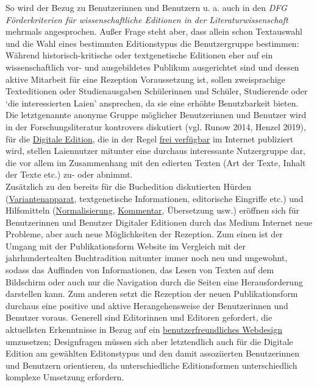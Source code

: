 \documentclass{article}
\begin{document}
        So wird der Bezug zu Benutzerinnen und Benutzern u. a. auch in den \emph{DFG Förderkriterien für wissenschaftliche Editionen in der Literaturwissenschaft} mehrmals angesprochen. Außer Frage steht aber, dass allein schon Textauswahl und die Wahl eines bestimmten Editionstypus die Benutzergruppe bestimmen: Während historisch-kritische oder textgenetische Editionen eher auf ein wissenschaftlich vor- und ausgebildetes Publikum ausgerichtet sind und dessen aktive Mitarbeit für eine Rezeption Voraussetzung ist, sollen zweisprachige Texteditionen oder Studienausgaben Schülerinnen und Schüler, Studierende oder ‘die interessierten Laien’ ansprechen, da sie eine erhöhte Benutzbarkeit bieten. \\
            
        Die letztgenannte anonyme Gruppe möglicher Benutzerinnen und Benutzer wird in der Forschungsliteratur kontrovers diskutiert (vgl. Runow 2014, Henzel 2019), für die \href{http://gams.uni-graz.at/o:konde.59}{Digitale Edition}, die in der Regel \href{http://gams.uni-graz.at/o:konde.152}{frei verfügbar} im Internet publiziert wird, stellen Laiennutzer mitunter eine durchaus interessante Nutzergruppe dar, die vor allem im Zusammenhang mit den edierten Texten (Art der Texte, Inhalt der Texte etc.) zu- oder abnimmt. \\
            
        Zusätzlich zu den bereits für die Buchedition diskutierten Hürden (\href{http://gams.uni-graz.at/o:konde.32}{Variantenapparat}, textgenetische Informationen, editorische Eingriffe etc.) und Hilfsmitteln (\href{http://gams.uni-graz.at/o:konde.146}{Normalisierung}, \href{http://gams.uni-graz.at/o:konde.34}{Kommentar}, Übersetzung usw.) eröffnen sich für Benutzerinnen und Benutzer Digitaler Editionen durch das Medium Internet neue Probleme, aber auch neue Möglichkeiten der Rezeption. Zum einen ist der Umgang mit der Publikationsform Website im Vergleich mit der jahrhundertealten Buchtradition mitunter immer noch neu und ungewohnt, sodass das Auffinden von Informationen, das Lesen von Texten auf dem Bildschirm oder auch nur die Navigation durch die Seiten eine Herausforderung darstellen kann. Zum anderen setzt die Rezeption der neuen Publikationsform durchaus eine positive und aktive Herangehensweise der Benutzerinnen und Benutzer voraus. Generell sind Editorinnen und Editoren gefordert, die aktuellsten Erkenntnisse in Bezug auf ein \href{http://gams.uni-graz.at/o:konde.207}{benutzerfreundliches Webdesign} umzusetzen; Designfragen müssen sich aber letztendlich auch für die Digitale Edition am gewählten Editonstypus und den damit assoziierten Benutzerinnen und Benutzern orientieren, da unterschiedliche Editionsformen unterschiedlich komplexe Umsetzung erfordern. \\
            
\end{document}
